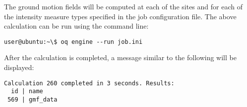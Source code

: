 The ground motion fields will be computed at each of the sites and for each of
the intensity measure types specified in the job configuration file. The
above calculation can be run using the command line:

\begin{verbatim}
user@ubuntu:~\$ oq engine --run job.ini
\end{verbatim}

After the calculation is completed, a message similar to the following will be
displayed:

\begin{verbatim}
Calculation 260 completed in 3 seconds. Results:
  id | name
 569 | gmf_data
\end{verbatim}